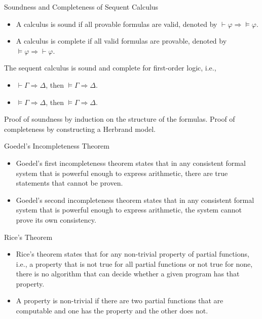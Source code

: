 \documentclass{beamer}
\begin{document}
        \begin{frame}{Soundness and Completeness of Sequent Calculus}
        \begin{itemize}
        \item A calculus is sound if all provable formulas are valid, denoted by $\vdash\varphi\Rightarrow\models\varphi$.
        \item A calculus is complete if all valid formulas are provable, denoted by $\models\varphi\Rightarrow\vdash\varphi$.
        \end{itemize}

        \vspace{0.5cm}
        The sequent calculus is sound and complete for first-order logic, i.e.,
        \begin{itemize}
        \item $\vdash\Gamma\Rightarrow\Delta$, then $\models\Gamma\Rightarrow\Delta$.
        \item $\models\Gamma\Rightarrow\Delta$, then $\models\Gamma\Rightarrow\Delta$.
        \end{itemize}
        \vspace*{0.5cm}

        Proof of soundness by induction on the structure of the formulas.
        Proof of completeness by constructing a Herbrand model.
      \end{frame}

      \begin{frame}{Goedel's Incompleteness Theorem}

        \begin{itemize}
        \item Goedel's first incompleteness theorem states that in any consistent formal system that is powerful enough to express arithmetic, there are true statements that cannot be proven.
        \item Goedel's second incompleteness theorem states that in any consistent formal system that is powerful enough to express arithmetic, the system cannot prove its own consistency.
        \end{itemize}
       \end{frame}

       \begin{frame}{Rice's Theorem}
        \begin{itemize}
        \item Rice's theorem states that for any non-trivial property of partial functions, i.e., a property that is not true for all partial functions or not true for none, there is no algorithm that can decide whether a given program has that property.
        \item A property is non-trivial if there are two partial functions that are computable and one has the property and the other does not.
        \end{itemize}
        \end{frame}
\end{document}
